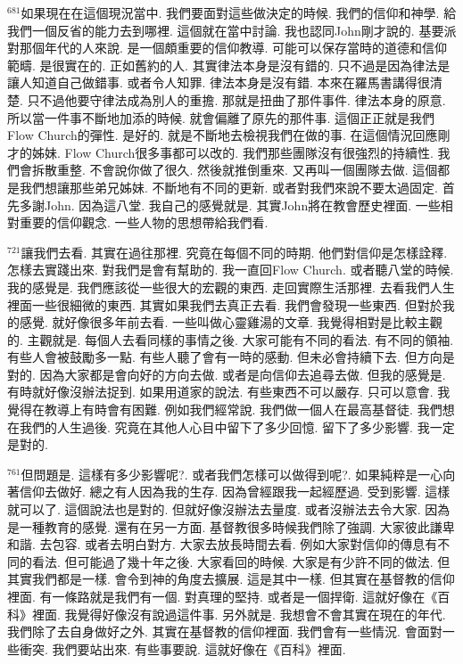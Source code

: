 \documentclass{book}
\begin{document}
$^{681}$如果現在在這個現況當中.
我們要面對這些做決定的時候.
我們的信仰和神學.
給我們一個反省的能力去到哪裡.
這個就在當中討論.
我也認同John剛才說的.
基要派對那個年代的人來說.
是一個頗重要的信仰教導.
可能可以保存當時的道德和信仰範疇.
是很實在的.
正如舊約的人.
其實律法本身是沒有錯的.
只不過是因為律法是讓人知道自己做錯事.
或者令人知罪.
律法本身是沒有錯.
本來在羅馬書講得很清楚.
只不過他要守律法成為別人的重擔.
那就是扭曲了那件事件.
律法本身的原意.
所以當一件事不斷地加添的時候.
就會偏離了原先的那件事.
這個正正就是我們Flow Church的彈性.
是好的.
就是不斷地去檢視我們在做的事.
在這個情況回應剛才的姊妹.
Flow Church很多事都可以改的.
我們那些團隊沒有很強烈的持續性.
我們會拆散重整.
不會說你做了很久.
然後就推倒重來.
又再叫一個團隊去做.
這個都是我們想讓那些弟兄姊妹.
不斷地有不同的更新.
或者對我們來說不要太過固定.
首先多謝John.
因為這八堂.
我自己的感覺就是.
其實John將在教會歷史裡面.
一些相對重要的信仰觀念.
一些人物的思想帶給我們看.

$^{721}$讓我們去看.
其實在過往那裡.
究竟在每個不同的時期.
他們對信仰是怎樣詮釋.
怎樣去實踐出來.
對我們是會有幫助的.
我一直回Flow Church.
或者聽八堂的時候.
我的感覺是.
我們應該從一些很大的宏觀的東西.
走回實際生活那裡.
去看我們人生裡面一些很細微的東西.
其實如果我們去真正去看.
我們會發現一些東西.
但對於我的感覺.
就好像很多年前去看.
一些叫做心靈雞湯的文章.
我覺得相對是比較主觀的.
主觀就是.
每個人去看同樣的事情之後.
大家可能有不同的看法.
有不同的領袖.
有些人會被鼓勵多一點.
有些人聽了會有一時的感動.
但未必會持續下去.
但方向是對的.
因為大家都是會向好的方向去做.
或者是向信仰去追尋去做.
但我的感覺是.
有時就好像沒辦法捉到.
如果用道家的說法.
有些東西不可以嚴存.
只可以意會.
我覺得在教導上有時會有困難.
例如我們經常說.
我們做一個人在最高基督徒.
我們想在我們的人生過後.
究竟在其他人心目中留下了多少回憶.
留下了多少影響.
我一定是對的.

$^{761}$但問題是.
這樣有多少影響呢?.
或者我們怎樣可以做得到呢?.
如果純粹是一心向著信仰去做好.
總之有人因為我的生存.
因為曾經跟我一起經歷過.
受到影響.
這樣就可以了.
這個說法也是對的.
但就好像沒辦法去量度.
或者沒辦法去令大家.
因為是一種教育的感覺.
還有在另一方面.
基督教很多時候我們除了強調.
大家彼此謙卑和諧.
去包容.
或者去明白對方.
大家去放長時間去看.
例如大家對信仰的傳息有不同的看法.
但可能過了幾十年之後.
大家看回的時候.
大家是有少許不同的做法.
但其實我們都是一樣.
會令到神的角度去擴展.
這是其中一樣.
但其實在基督教的信仰裡面.
有一條路就是我們有一個.
對真理的堅持.
或者是一個捍衛.
這就好像在《百科》裡面.
我覺得好像沒有說過這件事.
另外就是.
我想會不會其實在現在的年代.
我們除了去自身做好之外.
其實在基督教的信仰裡面.
我們會有一些情況.
會面對一些衝突.
我們要站出來.
有些事要說.
這就好像在《百科》裡面.
\end{document}
